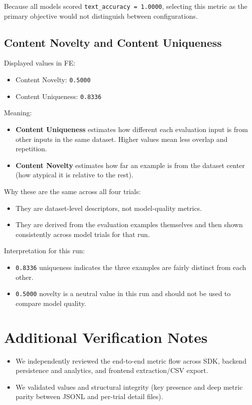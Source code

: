\documentclass[11pt]{article}
\begin{document}
Because all models scored \texttt{text\_accuracy = 1.0000}, selecting this metric as the primary objective would not distinguish between configurations.

\subsection{Content Novelty and Content Uniqueness}

Displayed values in FE:
\begin{itemize}
    \item Content Novelty: \texttt{0.5000}
    \item Content Uniqueness: \texttt{0.8336}
\end{itemize}

Meaning:
\begin{itemize}
    \item \textbf{Content Uniqueness} estimates how different each evaluation input is from other inputs in the same dataset. Higher values mean less overlap and repetition.
    \item \textbf{Content Novelty} estimates how far an example is from the dataset center (how atypical it is relative to the rest).
\end{itemize}

Why these are the same across all four trials:
\begin{itemize}
    \item They are dataset-level descriptors, not model-quality metrics.
    \item They are derived from the evaluation examples themselves and then shown consistently across model trials for that run.
\end{itemize}

Interpretation for this run:
\begin{itemize}
    \item \texttt{0.8336} uniqueness indicates the three examples are fairly distinct from each other.
    \item \texttt{0.5000} novelty is a neutral value in this run and should not be used to compare model quality.
\end{itemize}

\section{Additional Verification Notes}

\begin{itemize}
    \item We independently reviewed the end-to-end metric flow across SDK, backend persistence and analytics, and frontend extraction/CSV export.
    \item We validated values and structural integrity (key presence and deep metric parity between JSONL and per-trial detail files).
\end{itemize}
\end{document}
